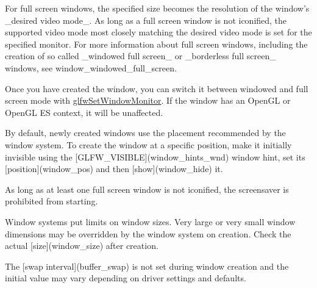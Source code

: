For full screen windows, the specified size becomes the resolution of the window's \_\-desired video mode\_\-. As long as a full screen window is not iconified, the supported video mode most closely matching the desired video mode is set for the specified monitor. For more information about full screen windows, including the creation of so called \_\-windowed full screen\_\- or \_\-borderless full screen\_\- windows, see window\_\-windowed\_\-full\_\-screen.

Once you have created the window, you can switch it between windowed and full screen mode with \hyperlink{group__window_g12fabf78575e59c00f822f323ae0b6ae}{glfwSetWindowMonitor}. If the window has an OpenGL or OpenGL ES context, it will be unaffected.

By default, newly created windows use the placement recommended by the window system. To create the window at a specific position, make it initially invisible using the \mbox{[}GLFW\_\-VISIBLE\mbox{]}(window\_\-hints\_\-wnd) window hint, set its \mbox{[}position\mbox{]}(window\_\-pos) and then \mbox{[}show\mbox{]}(window\_\-hide) it.

As long as at least one full screen window is not iconified, the screensaver is prohibited from starting.

Window systems put limits on window sizes. Very large or very small window dimensions may be overridden by the window system on creation. Check the actual \mbox{[}size\mbox{]}(window\_\-size) after creation.

The \mbox{[}swap interval\mbox{]}(buffer\_\-swap) is not set during window creation and the initial value may vary depending on driver settings and defaults.

